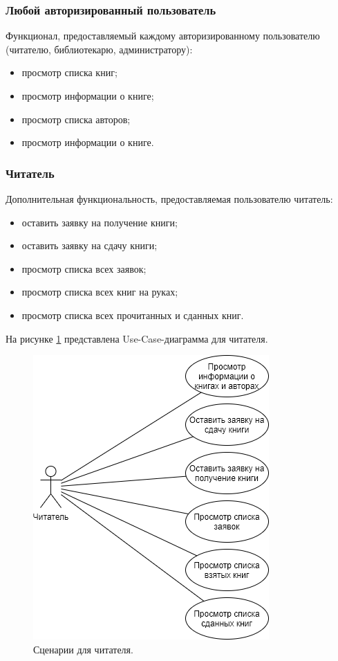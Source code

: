 \subsubsection{Любой авторизированный пользователь}
Функционал, предоставляемый каждому авторизированному пользователю (читателю, библиотекарю, администратору):
\begin{itemize}
	\item[1)] просмотр списка книг;
	\item[2)] просмотр информации о книге;
	\item[3)] просмотр списка авторов;
	\item[4)] просмотр информации о книге.      
\end{itemize}
\subsubsection{Читатель}
Дополнительная функциональность, предоставляемая пользователю читатель:
\begin{itemize}
	\item[1)] оставить заявку на получение книги;
	\item[2)] оставить заявку на сдачу книги;
	\item[3)] просмотр списка всех заявок;
	\item[4)] просмотр списка всех книг на руках;
	\item[5)] просмотр списка всех прочитанных и сданных книг.
\end{itemize}
На рисунке \ref{img:UseCaseReader} представлена Use-Case-диаграмма для читателя.
\begin{figure}[h!]
	\centering
	\includegraphics[scale=1]{img/UseCaseReader.png}
	\caption{Сценарии для читателя.}
	\label{img:UseCaseReader}
\end{figure}
\clearpage

